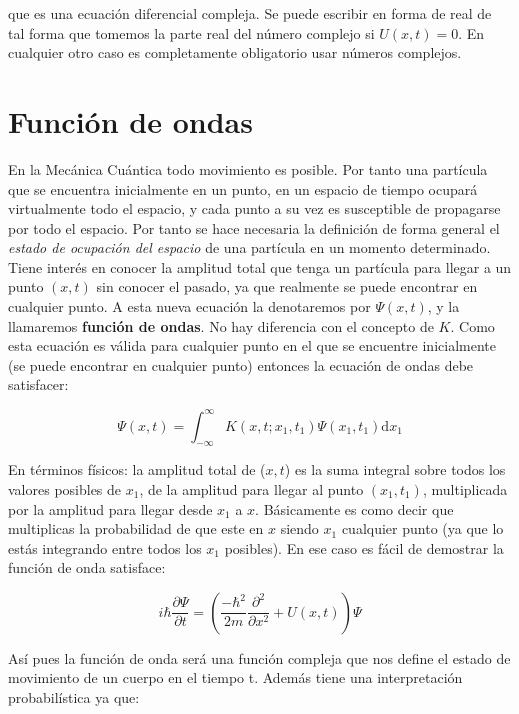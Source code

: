 \documentclass[12pt]{article}
\newcommand{\parentesis}[1]{\left( #1  \right)}
\newcommand{\parciales}[2]{\frac{\partial #1}{\partial #2}}
\newcommand{\D}{\mathrm{d}}
\begin{document}
que es una ecuación diferencial compleja. Se puede escribir en forma de real de tal forma que tomemos la parte real del número complejo si $U(x,t) = 0$. En cualquier otro caso es completamente obligatorio usar números complejos.


\section{Función de ondas}

En la Mecánica Cuántica todo movimiento es posible. Por tanto una partícula que se encuentra inicialmente en un punto, en un espacio de tiempo ocupará virtualmente todo el espacio, y cada punto a su vez es susceptible de propagarse por todo el espacio. Por tanto se hace necesaria la definición de forma general el \textit{estado de ocupación del espacio} de una partícula en un momento determinado. \\

Tiene interés en conocer la amplitud total que tenga un partícula para llegar a un punto $(x,t)$ sin conocer el pasado, ya que realmente se puede encontrar en cualquier punto. A esta nueva ecuación la denotaremos por $\Psi (x,t)$, y la llamaremos \textbf{función de ondas}. No hay diferencia con el concepto de $K$. Como esta ecuación es válida para cualquier punto en el que se encuentre inicialmente (se puede encontrar en cualquier punto) entonces la ecuación de ondas debe satisfacer:

\begin{equation}
\Psi (x,t) = \int_{-\infty}^\infty K(x,t;x_1,t_1) \Psi (x_1,t_1) \D x_1
\end{equation}

En términos físicos: la amplitud total de ($x,t$) es la suma integral sobre todos los valores posibles de $x_1$, de la amplitud para llegar al punto $(x_1,t_1)$, multiplicada por la amplitud para llegar desde $x_1$ a $x$. Básicamente es como decir que multiplicas la probabilidad de que este en $x$ siendo $x_1$ cualquier punto (ya que lo estás integrando entre todos los $x_1$ posibles). En ese caso es fácil de demostrar la función de onda satisface:

\begin{equation}
i \hbar \parciales{\Psi}{t} = \parentesis{\dfrac{- \hbar^2}{2m} \parciales{^2}{x^2} + U(x,t)}\Psi
\end{equation}

Así pues la función de onda será una función compleja que nos define el estado de movimiento de un cuerpo en el tiempo t. Además tiene una interpretación probabilística ya que:
\end{document}
